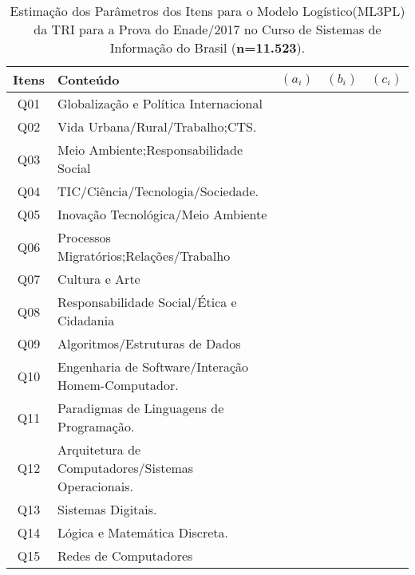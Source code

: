 \documentclass[12pt]{article}
\begin{document}
\begin{table}[]
	\centering
	\caption{Estimação dos Parâmetros dos Itens para o Modelo Logístico(ML3PL) da TRI para a Prova do Enade/2017 no Curso de Sistemas de Informação do Brasil (\textbf{n=11.523}).}
\begin{tabular}{c|l|c|c|c}
\hline\hline 
  Itens     &  Conteúdo                                            &  $(a_{i})$  & $(b_{i})$ & $(c_{i})$ \\
\hline\hline
  Q01       &  Globalização e Política Internacional               &             &           &     \\
  Q02       &  Vida Urbana/Rural/Trabalho;CTS.                     &             &           &       \\
  Q03       &  Meio Ambiente;Responsabilidade Social               &             &           &       \\
  Q04       &  TIC/Ciência/Tecnologia/Sociedade.                   &             &           &     \\
  Q05       & Inovação Tecnológica/Meio Ambiente                   &             &           &       \\
  Q06       & Processos Migratórios;Relações/Trabalho              &             &           &       \\
  Q07       & Cultura e Arte                                       &             &           &      \\
  Q08       & Responsabilidade Social/Ética e Cidadania            &             &           &       \\
  Q09       & Algoritmos/Estruturas de Dados                       &             &           &    \\
  Q10       & Engenharia de Software/Interação Homem-Computador.   &             &           &     \\
  Q11       & Paradigmas de Linguagens de Programação.             &             &           &       \\
  Q12       & Arquitetura de Computadores/Sistemas Operacionais.   &             &           &       \\
  Q13       & Sistemas Digitais.                                   &             &           &       \\
  Q14       & Lógica e Matemática Discreta.                        &             &           &       \\
  Q15       & Redes de Computadores                                &             &           &      \\

\end{tabular}
\end{table}
\end{document}
